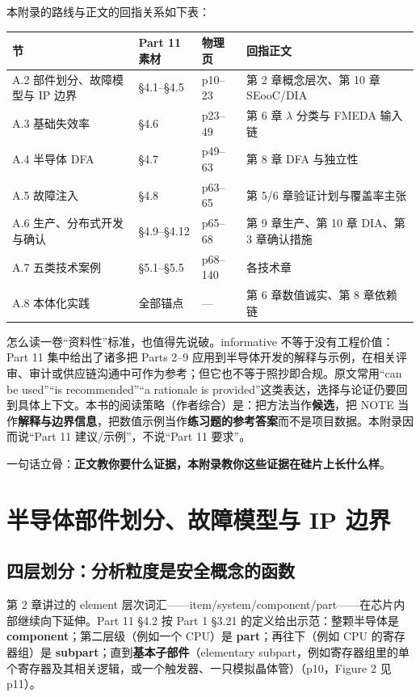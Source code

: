 本附录的路线与正文的回指关系如下表：

\begin{center}
\begingroup\small
\setlength{\tabcolsep}{4pt}
\begin{tabularx}{\linewidth}{@{}XXXX@{}}
\toprule
节 & Part 11 素材 & 物理页 & 回指正文 \\
\midrule
A.2 部件划分、故障模型与 IP 边界 & §4.1–§4.5 & p10–23 & 第 2 章概念层次、第 10 章 SEooC/DIA \\
A.3 基础失效率 & §4.6 & p23–49 & 第 6 章 \(\lambda\) 分类与 FMEDA 输入链 \\
A.4 半导体 DFA & §4.7 & p49–63 & 第 8 章 DFA 与独立性 \\
A.5 故障注入 & §4.8 & p63–65 & 第 5/6 章验证计划与覆盖率主张 \\
A.6 生产、分布式开发与确认 & §4.9–§4.12 & p65–68 & 第 9 章生产、第 10 章 DIA、第 3 章确认措施 \\
A.7 五类技术案例 & §5.1–§5.5 & p68–140 & 各技术章 \\
A.8 本体化实践 & 全部锚点 & — & 第 6 章数值诚实、第 8 章依赖链 \\
\bottomrule
\end{tabularx}
\endgroup
\end{center}

怎么读一卷“资料性”标准，也值得先说破。informative 不等于没有工程价值：Part 11 集中给出了诸多把 Parts 2–9 应用到半导体开发的解释与示例，在相关评审、审计或供应链沟通中可作为参考；但它也不等于照抄即合规。原文常用“can be used”“is recommended”“a rationale is provided”这类表达，选择与论证仍要回到具体上下文。本书的阅读策略（作者综合）是：把方法当作\textbf{候选}，把 NOTE 当作\textbf{解释与边界信息}，把数值示例当作\textbf{练习题的参考答案}而不是项目数据。本附录因而说“Part 11 建议/示例”，不说“Part 11 要求”。

一句话立骨：\textbf{正文教你要什么证据，本附录教你这些证据在硅片上长什么样}。

\section{半导体部件划分、故障模型与 IP 边界}

\subsection{四层划分：分析粒度是安全概念的函数}

第 2 章讲过的 element 层次词汇——item/system/component/part——在芯片内部继续向下延伸。Part 11 §4.2 按 Part 1 §3.21 的定义给出示范：整颗半导体是 \textbf{component}；第二层级（例如一个 CPU）是 \textbf{part}；再往下（例如 CPU 的寄存器组）是 \textbf{subpart}；直到\textbf{基本子部件}（elementary subpart，例如寄存器组里的单个寄存器及其相关逻辑，或一个触发器、一只模拟晶体管）（p10，Figure 2 见 p11）。


